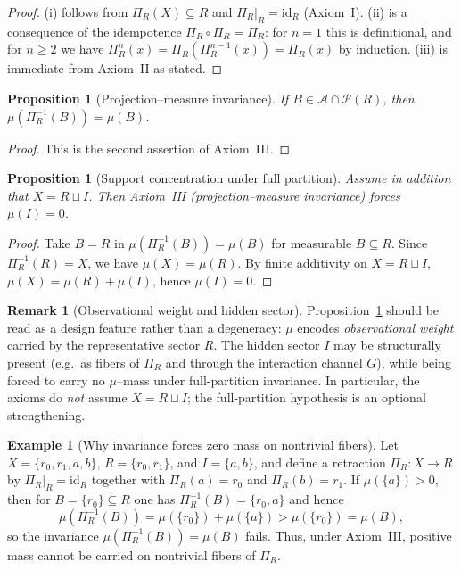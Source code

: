 \documentclass[11pt]{article}
\numberwithin{equation}{section}
\newtheorem{proposition}[theorem]{Proposition}
\theoremstyle{definition}
\newtheorem{remark}[theorem]{Remark}
\newtheorem{example}[theorem]{Example}
\begin{document}
\begin{proof}
(i) follows from $\Pi_R(X)\subseteq R$ and $\Pi_R|_R=\mathrm{id}_R$ (Axiom~I). (ii) is a consequence of the idempotence $\Pi_R\circ\Pi_R=\Pi_R$: for $n=1$ this is definitional, and for $n\ge 2$ we have $\Pi_R^n(x)=\Pi_R(\Pi_R^{n-1}(x))=\Pi_R(x)$ by induction. (iii) is immediate from Axiom~II as stated.
\end{proof}

\begin{proposition}[Projection--measure invariance]\label{prop:projection-measure}
If $B\in\mathcal A\cap\mathcal P(R)$, then $\mu(\Pi_R^{-1}(B))=\mu(B)$.
\end{proposition}

\begin{proof}
This is the second assertion of Axiom~III.
\end{proof}

\begin{proposition}[Support concentration under full partition]\label{prop:muI-zero}
Assume in addition that $X=R\sqcup I$. Then Axiom~III (projection--measure invariance) forces $\mu(I)=0$.
\end{proposition}

\begin{proof}
Take $B=R$ in $\mu(\Pi_R^{-1}(B))=\mu(B)$ for measurable $B\subseteq R$.
Since $\Pi_R^{-1}(R)=X$, we have $\mu(X)=\mu(R)$.
By finite additivity on $X=R\sqcup I$, $\mu(X)=\mu(R)+\mu(I)$, hence $\mu(I)=0$.
\end{proof}

\begin{remark}[Observational weight and hidden sector]
Proposition~\ref{prop:muI-zero} should be read as a design feature rather than a degeneracy: $\mu$ encodes
\emph{observational weight} carried by the representative sector $R$.
The hidden sector $I$ may be structurally present (e.g.\ as fibers of $\Pi_R$ and through the interaction channel $G$),
while being forced to carry no $\mu$--mass under full-partition invariance.
In particular, the axioms do \emph{not} assume $X=R\sqcup I$; the full-partition hypothesis is an optional strengthening.
\end{remark}

\begin{example}[Why invariance forces zero mass on nontrivial fibers]\label{ex:fiber-mass}
Let $X=\{r_0,r_1,a,b\}$, $R=\{r_0,r_1\}$, and $I=\{a,b\}$, and define a retraction $\Pi_R:X\to R$ by
$\Pi_R|_R=\mathrm{id}_R$ together with $\Pi_R(a)=r_0$ and $\Pi_R(b)=r_1$.
If $\mu(\{a\})>0$, then for $B=\{r_0\}\subseteq R$ one has $\Pi_R^{-1}(B)=\{r_0,a\}$ and hence
\[
\mu(\Pi_R^{-1}(B))=\mu(\{r_0\})+\mu(\{a\})>\mu(\{r_0\})=\mu(B),
\]
so the invariance $\mu(\Pi_R^{-1}(B))=\mu(B)$ fails.
Thus, under Axiom~III, positive mass cannot be carried on nontrivial fibers of $\Pi_R$.
\end{example}
\end{document}
